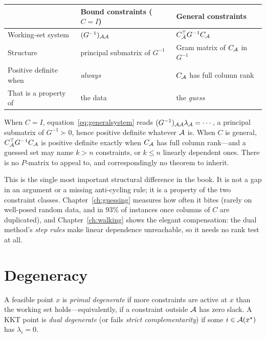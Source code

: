 \begin{center}
\begin{tabular}{lll}
\toprule
 & Bound constraints ($C = I$) & General constraints \\
\midrule
Working-set system & $(G^{-1})_{\mathcal{A}\mathcal{A}}$ & $C_{\mathcal{A}}^{\top} G^{-1} C_{\mathcal{A}}$ \\
Structure & principal submatrix of $G^{-1}$ & Gram matrix of $C_{\mathcal{A}}$ in $G^{-1}$ \\
Positive definite when & \emph{always} & $C_{\mathcal{A}}$ has full column rank \\
That is a property of & the data & the \emph{guess} \\
\bottomrule
\end{tabular}
\end{center}

When $C = I$, equation~\eqref{eq:generalsystem} reads
$(G^{-1})_{\mathcal{A}\mathcal{A}}\lambda_{\mathcal{A}} = \cdots$, a principal submatrix of
$G^{-1} \succ 0$, hence positive definite whatever $\mathcal{A}$ is. When $C$ is
general, $C_{\mathcal{A}}^{\top} G^{-1} C_{\mathcal{A}}$ is positive definite exactly when
$C_{\mathcal{A}}$ has full column rank---and a guessed set may name $k > n$ constraints,
or $k \le n$ linearly dependent ones. There is no $P$-matrix to appeal to, and
correspondingly no theorem to inherit.

This is the single most important structural difference in the book. It is not a
gap in an argument or a missing anti-cycling rule; it is a property of the two
constraint classes. Chapter~\ref{ch:guessing} measures how often it bites (rarely
on well-posed random data, and in $93\%$ of instances once columns of $C$ are
duplicated), and Chapter~\ref{ch:walking} shows the elegant compensation: the dual
method's \emph{step rules} make linear dependence unreachable, so it needs no rank
test at all.

\section{Degeneracy}

\begin{definition}
A feasible point $x$ is \emph{primal degenerate} if more constraints are active at
$x$ than the working set holds---equivalently, if a constraint outside $\mathcal{A}$
has zero slack. A KKT point is \emph{dual degenerate} (or fails \emph{strict
complementarity}) if some $i \in \mathcal{A}(x^\star)$ has $\lambda_i = 0$.
\end{definition}

